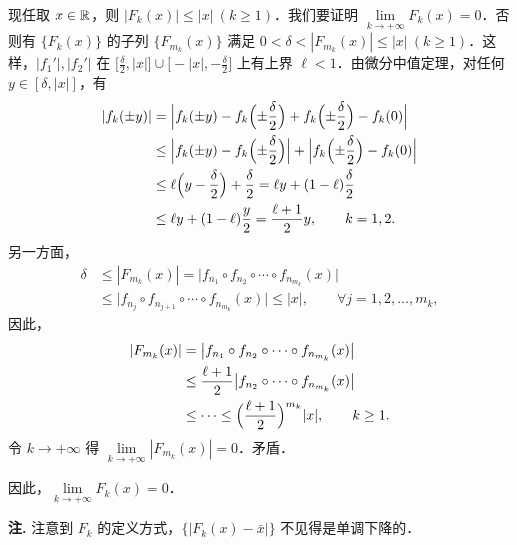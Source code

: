 \begin{solution}
现任取 $x\in\mathbb{R}$，则 $|F_k(x)|\le |x|\ (k\ge 1)$．我们要证明 $\lim\limits_{k\to+\infty}F_k(x)=0$．否则有 $\{F_k(x)\}$ 的子列 $\{F_{m_k}(x)\}$ 满足 $0<\delta<|F_{m_k}(x)|\le |x|\ (k\ge 1)$．这样，$|f_1'|,|f_2'|$ 在
$\bigl[\frac{\delta}{2},|x|\bigr]\cup\bigl[-|x|,-\frac{\delta}{2}\bigr]$ 上有上界 $\ell<1$．由微分中值定理，对任何 $y\in[\delta,|x|]$，有
\begin{align*}
  |f_k(\pm y)|
  &=\Bigl|f_k(\pm y)-f_k\Bigl(\pm\frac{\delta}{2}\Bigr)+f_k\Bigl(\pm\frac{\delta}{2}\Bigr)-f_k(0)\Bigr|\\
  &\le \Bigl|f_k(\pm y)-f_k\Bigl(\pm\frac{\delta}{2}\Bigr)\Bigr|
   +\Bigl|f_k\Bigl(\pm\frac{\delta}{2}\Bigr)-f_k(0)\Bigr|\\
  &\le \ell\Bigl(y-\frac{\delta}{2}\Bigr)+\frac{\delta}{2}
   =\ell y+(1-\ell)\frac{\delta}{2}\\
  &\le \ell y+(1-\ell)\frac{y}{2}=\frac{\ell+1}{2}y,\qquad k=1,2.
\end{align*}
另一方面，
\begin{align*}
  \delta &\le |F_{m_k}(x)|=\bigl|f_{n_1}\circ f_{n_2}\circ\cdots\circ f_{n_{m_k}}(x)\bigr|\\
  &\le \bigl|f_{n_j}\circ f_{n_{j+1}}\circ\cdots\circ f_{n_{m_k}}(x)\bigr|\le |x|,
  \qquad \forall j=1,2,\dots,m_k,
\end{align*}
因此，
\begin{align*}
  |F_{m_k}(x)|
  &=\bigl|f_{n_1}\circ f_{n_2}\circ\cdots\circ f_{n_{m_k}}(x)\bigr|\\
  &\le \frac{\ell+1}{2}\bigl|f_{n_2}\circ\cdots\circ f_{n_{m_k}}(x)\bigr|\\
  &\le \cdots\le \Bigl(\frac{\ell+1}{2}\Bigr)^{m_k}|x|,\qquad k\ge 1.
\end{align*}
令 $k\to+\infty$ 得 $\lim\limits_{k\to+\infty}|F_{m_k}(x)|=0$．矛盾．

因此，$\lim\limits_{k\to+\infty}F_k(x)=0$．

\textbf{注.} 注意到 $F_k$ 的定义方式，$\{|F_k(x)-\bar{x}|\}$ 不见得是单调下降的．
\end{solution}
